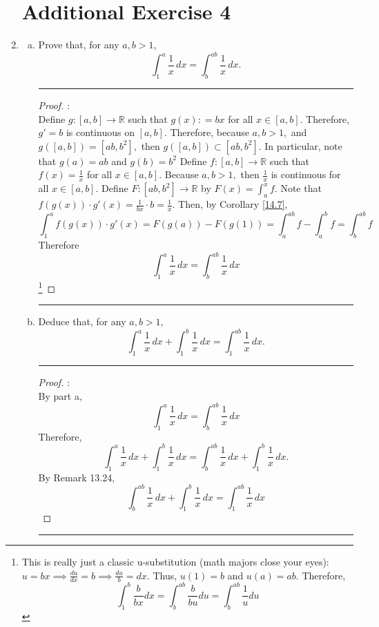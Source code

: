 \documentclass[openany, amssymb, psamsfonts]{amsart}
\newcommand{\bbR}{\mathbb{R}}
\theoremstyle{definition}
\numberwithin{equation}{section}
\begin{document}
\begin{enumerate}
\section*{Additional Exercise 4}
\item
	\label{exer:one-over-x}
	\begin{enumerate}[(a)]
		\item Prove that, for any $a, b > 1$,
		\[
			\int_1^a \frac{1}{x}\,dx=\int_b^{ab}\frac{1}{x}\,dx.
		\]
\vspace{4pt}     \hrule   \vspace{4pt} \begin{proof}:\\
Define $g:[a,b] \to \bbR$ such that $g(x): = bx$ for all $x\in [a,b].$ Therefore, $g' = b$ is continuous on $[a,b].$ Therefore, because $a,b>1,$ and $g([a,b]) = [ab,b^2],$ then $g([a,b])\subset [ab,b^2].$ In particular, note that $g(a) = ab$ and $g(b) = b^2$ Define $f:[a,b]\to \bbR$ such that $f(x) = \frac{1}{x}$ for all $x\in [a,b].$ Because $a,b>1,$ then $\frac{1}{x}$ is continuous for all $x\in [a,b].$ Define $F:[ab,b^2]\to \bbR$ by $F(x) = \int_a^xf.$ Note that $f(g(x)) \cdot g'(x) = \frac{1}{bx} \cdot b = \frac{1}{x}.$ Then, by Corollary \ref{14.7}, \[\int_1^af(g(x))\cdot g'(x) = F(g(a)) - F(g(1)) = \int_a^{ab}f  - \int_a^{b}f = \int_b^{ab}f\]
Therefore \[\int_1^a \frac{1}{x}\,dx = \int_b^{ab} \frac{1}{x}\,dx\]
\footnote{This is really just a classic u-substitution (math majors close your eyes): $u=bx \implies \frac{du}{dx} = b \implies \frac{du}{b}=dx.$ Thus, $u(1) = b$ and $u(a) = ab.$ Therefore, \[\int_1^b\frac{b}{bx}dx = \int_b^{ab}\frac{b}{bu}du  = \int_b^{ab}\frac{1}{u}du\]}
\end{proof}\vspace{4pt}     \hrule   \vspace{4pt}
		\item Deduce that, for any $a, b > 1$,
		\[
			\int_1^a\frac{1}{x}\,dx+\int_1^b\frac{1}{x}\,dx=\int_1^{ab}\frac{1}{x}\,dx.
		\]
\vspace{4pt}     \hrule   \vspace{4pt} \begin{proof}:\\
By part a, \[\int_1^a \frac{1}{x}\,dx = \int_b^{ab}\frac{1}{x}\,dx\]
Therefore, \[\int_1^a\frac{1}{x}\,dx+\int_1^b\frac{1}{x}\,dx= \int_b^{ab}\frac{1}{x}\,dx+\int_1^b\frac{1}{x}\,dx.\] By Remark 13.24, \[\int_b^{ab}\frac{1}{x}\,dx+\int_1^b\frac{1}{x}\,dx = \int_1^{ab}\frac{1}{x}\,dx\]
\end{proof}\vspace{4pt}     \hrule   \vspace{4pt}
	\end{enumerate}


\end{enumerate}
\end{document}

